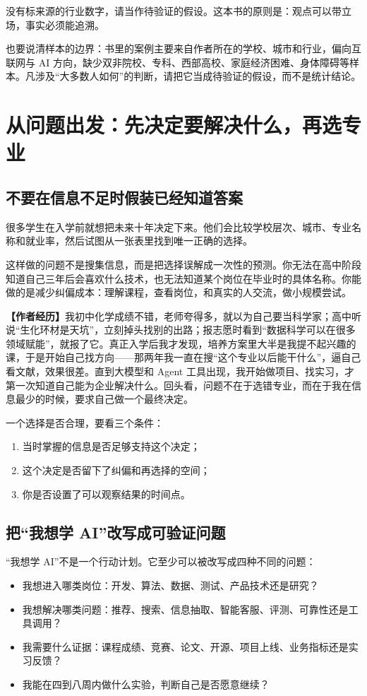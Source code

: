 \documentclass[UTF8,zihao=5,openany]{ctexbook}
\begin{document}
没有标来源的行业数字，请当作待验证的假设。这本书的原则是：观点可以带立场，事实必须能追溯。

也要说清样本的边界：书里的案例主要来自作者所在的学校、城市和行业，偏向互联网与 AI 方向，缺少双非院校、专科、西部高校、家庭经济困难、身体障碍等样本。凡涉及“大多数人如何”的判断，请把它当成待验证的假设，而不是统计结论。

\clearpage
\tableofcontents
\clearpage
\listoffigures
\clearpage
\listoftables
\mainmatter
\clearpage\chapter{从问题出发：先决定要解决什么，再选专业}
\section{不要在信息不足时假装已经知道答案}
很多学生在入学前就想把未来十年决定下来。他们会比较学校层次、城市、专业名称和就业率，然后试图从一张表里找到唯一正确的选择。

这样做的问题不是搜集信息，而是把选择误解成一次性的预测。你无法在高中阶段知道自己三年后会喜欢什么技术，也无法知道某个岗位在毕业时的具体名称。你能做的是减少纠偏成本：理解课程，查看岗位，和真实的人交流，做小规模尝试。

\begin{casebox}
\textbf{【作者经历】}我初中化学成绩不错，老师夸得多，就以为自己要当科学家；高中听说“生化环材是天坑”，立刻掉头找别的出路；报志愿时看到“数据科学可以在很多领域赋能”，就报了它。真正入学后我才发现，培养方案里大半是我提不起兴趣的课，于是开始自己找方向——那两年我一直在搜“这个专业以后能干什么”，逼自己看文献，效果很差。直到大模型和 Agent 工具出现，我开始做项目、找实习，才第一次知道自己能为企业解决什么。回头看，问题不在于选错专业，而在于我在信息最少的时候，要求自己做一个最终决定。
\end{casebox}

一个选择是否合理，要看三个条件：
\begin{enumerate}
\item 当时掌握的信息是否足够支持这个决定；
\item 这个决定是否留下了纠偏和再选择的空间；
\item 你是否设置了可以观察结果的时间点。
\end{enumerate}

\section{把“我想学 AI”改写成可验证问题}
“我想学 AI”不是一个行动计划。它至少可以被改写成四种不同的问题：
\begin{itemize}
\item 我想进入哪类岗位：开发、算法、数据、测试、产品技术还是研究？
\item 我想解决哪类问题：推荐、搜索、信息抽取、智能客服、评测、可靠性还是工具调用？
\item 我需要什么证据：课程成绩、竞赛、论文、开源、项目上线、业务指标还是实习反馈？
\item 我能在四到八周内做什么实验，判断自己是否愿意继续？
\end{itemize}
\end{document}
